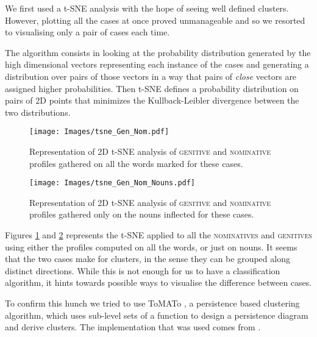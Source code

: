 \documentclass[11pt]{article}
\newcommand{\scsf}[1]{\textsc{\textsf{#1}}} %
\begin{document}
We first used a t-SNE analysis \cite{tSNE} with the hope of seeing well defined clusters.
However, plotting all the cases at once proved unmanageable and so we resorted to visualising only a pair of cases each time.

The algorithm consists in looking at the probability distribution generated by the high dimensional vectors representing each instance of the cases and generating a distribution over pairs of those vectors in a way that pairs of \emph{close} vectors are assigned higher probabilities. 
Then t-SNE defines a probability distribution on pairs of 2D points that minimizes the Kullback-Leibler divergence between the two distributions. 


\begin{figure}[h]
    \begin{center}
    \texttt{[image: Images/tsne\_Gen\_Nom.pdf]}
    \end{center}
    \caption{Representation of 2D t-SNE analysis of \scsf{genitive} and \scsf{nominative} profiles gathered on all the words marked for these cases.}
    \label{fig:tsne1}
\end{figure}

\begin{figure}[h]
    \begin{center}
    \texttt{[image: Images/tsne\_Gen\_Nom\_Nouns.pdf]}
    \end{center}
    \caption{Representation of 2D t-SNE analysis of \scsf{genitive} and \scsf{nominative} profiles gathered only on the nouns inflected for these cases.}
\label{fig:tsne2}
\end{figure}

Figures \ref{fig:tsne1} and \ref{fig:tsne2} represents the t-SNE applied to all the \scsf{nominatives} and \scsf{genitives} using either the profiles computed on all the words, or just on nouns.
It seems that the two cases make for clusters, in the sense they can be grouped along distinct directions. 
While this is not enough for us to have a classification algorithm, it hints towards possible ways to visualise the difference between cases. 

To confirm this hunch we tried to use ToMATo \cite{ToMATo}, a persistence based clustering algorithm, which uses sub-level sets of a function to design a persistence diagram and derive clusters. 
The implementation that was used comes from .
\end{document}
